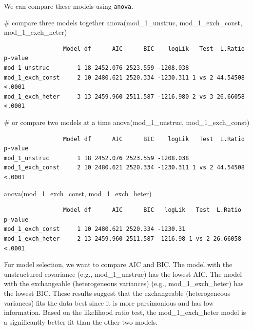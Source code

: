 \documentclass[
  letterpaper,
  DIV=11,
  numbers=noendperiod]{scrreprt}
\newenvironment{Shaded}{\begin{snugshade}}{\end{snugshade}}
\newcommand{\CommentTok}[1]{\textcolor[rgb]{0.37,0.37,0.37}{#1}}
\newcommand{\FunctionTok}[1]{\textcolor[rgb]{0.28,0.35,0.67}{#1}}
\newcommand{\NormalTok}[1]{\textcolor[rgb]{0.00,0.23,0.31}{#1}}
\begin{document}
We can compare these models using \texttt{anova}.

\begin{Shaded}
\begin{Highlighting}[]
\CommentTok{\# compare three models together}
\FunctionTok{anova}\NormalTok{(mod\_1\_unstruc, mod\_1\_exch\_const, mod\_1\_exch\_heter)}
\end{Highlighting}
\end{Shaded}

\begin{verbatim}
                 Model df      AIC      BIC    logLik   Test  L.Ratio p-value
mod_1_unstruc        1 18 2452.076 2523.559 -1208.038                        
mod_1_exch_const     2 10 2480.621 2520.334 -1230.311 1 vs 2 44.54508  <.0001
mod_1_exch_heter     3 13 2459.960 2511.587 -1216.980 2 vs 3 26.66058  <.0001
\end{verbatim}

\begin{Shaded}
\begin{Highlighting}[]
\CommentTok{\# or compare two models at a time}
\FunctionTok{anova}\NormalTok{(mod\_1\_unstruc, mod\_1\_exch\_const)}
\end{Highlighting}
\end{Shaded}

\begin{verbatim}
                 Model df      AIC      BIC    logLik   Test  L.Ratio p-value
mod_1_unstruc        1 18 2452.076 2523.559 -1208.038                        
mod_1_exch_const     2 10 2480.621 2520.334 -1230.311 1 vs 2 44.54508  <.0001
\end{verbatim}

\begin{Shaded}
\begin{Highlighting}[]
\FunctionTok{anova}\NormalTok{(mod\_1\_exch\_const, mod\_1\_exch\_heter)}
\end{Highlighting}
\end{Shaded}

\begin{verbatim}
                 Model df      AIC      BIC   logLik   Test  L.Ratio p-value
mod_1_exch_const     1 10 2480.621 2520.334 -1230.31                        
mod_1_exch_heter     2 13 2459.960 2511.587 -1216.98 1 vs 2 26.66058  <.0001
\end{verbatim}

For model selection, we want to compare AIC and BIC. The model with the
unstructured covariance (e.g., mod\_1\_unstruc) has the lowest AIC. The
model with the exchangeable (heterogeneous variances) (e.g.,
mod\_1\_exch\_heter) has the lowest BIC. These results suggest that the
exchangeable (heterogeneous variances) fits the data best since it is
more parsimonious and has low information. Based on the likelihood ratio
test, the mod\_1\_exch\_heter model is a significantly better fit than
the other two models.
\end{document}
